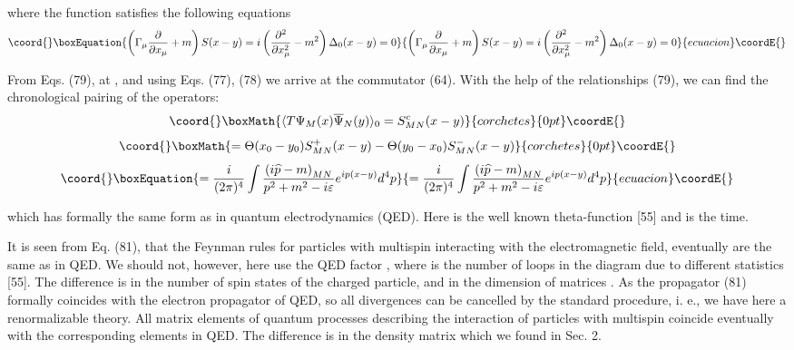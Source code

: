 \documentclass[a4paper,12pt]{article}
\begin{document}
where the function \coordHE{} satisfies the following equations
\begin{equation}\coord{}\boxEquation{
\left( \Gamma _\mu \frac \partial {\partial x_\mu }+m\right) S(x-y)=i\left(
\frac{\partial ^2}{\partial x_\mu ^2}-m^2\right) \Delta _0(x-y)=0  \label{80}
}{
\left( \Gamma _\mu \frac \partial {\partial x_\mu }+m\right) S(x-y)=i\left(
\frac{\partial ^2}{\partial x_\mu ^2}-m^2\right) \Delta _0(x-y)=0  }{ecuacion}\coordE{}\end{equation}

From Eqs. (79), at \coordHE{}, and using Eqs. (77), (78) we arrive at
the commutator (64). With the help of the relationships (79), we can find
the chronological pairing of the operators:
\[\coord{}\boxMath{
\langle T\Psi _M(x)\overline{\Psi }_N(y)\rangle _0=S_{MN}^c(x-y)
}{corchetes}{0pt}\coordE{}\]
\[\coord{}\boxMath{
=\Theta (x_0-y_0)S_{MN}^{+}(x-y)-\Theta (y_0-x_0)S_{MN}^{-}(x-y)
}{corchetes}{0pt}\coordE{}\]
\begin{equation}\coord{}\boxEquation{
=\frac i{(2\pi )^4}\int \frac{\left( i\widehat{p}-m\right) _{MN}}{
p^2+m^2-i\varepsilon }e^{ip(x-y)}d^4p  \label{81}
}{
=\frac i{(2\pi )^4}\int \frac{\left( i\widehat{p}-m\right) _{MN}}{
p^2+m^2-i\varepsilon }e^{ip(x-y)}d^4p  }{ecuacion}\coordE{}\end{equation}

which has formally the same form as in quantum electrodynamics
(QED). Here \coordHE{} is the well known theta-function [55]
and \coordHE{} is the time.

It is seen from Eq. (81), that the Feynman rules for particles with
multispin \coordHE{} interacting with the electromagnetic field, eventually are
the same as in QED. We should not, however, here use the QED factor \coordHE{}, where \coordHE{} is the number of loops in the diagram due to different
statistics [55]. The difference is in the number of spin states of the
charged particle, and in the dimension of matrices \myHighlight{$\Gamma _\mu $}\coordHE{}. As the
propagator (81) formally coincides with the electron propagator of QED, so
all divergences can be cancelled by the standard procedure, i. e., we have
here a renormalizable theory. All matrix elements of quantum processes
describing the interaction of particles with multispin \coordHE{} coincide
eventually with the corresponding elements in QED. The difference is in the
density matrix \myHighlight{$\Psi \cdot \overline{\Psi }$}\coordHE{} which we found in Sec. 2.
\end{document}
